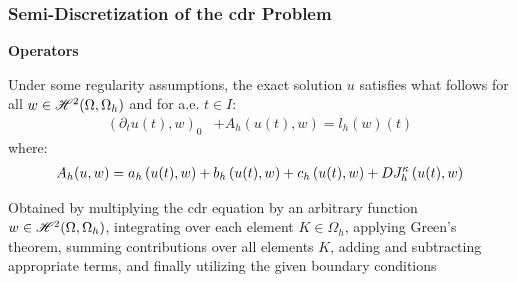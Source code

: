 \begin{frame}
    \frametitle{Semi-Discretization of the \acrshort{cdr} Problem}

    \vspace*{\fill}
    \begin{center}
        {\color{\accentcolor} \Large \textbf{Operators}}
        \vspace*{0.25cm}

        \begin{minipage}{0.75\textwidth}
            \begin{definition}
                Under some regularity assumptions, the exact solution $u$ satisfies what follows for all $w \in \mathscr{H}^{2}(\Omega, \Omega_h)$ and for a.e. $t \in I$:
                \begin{align*}
                    \left( \partial_t u(t), w \right)_0 &+ A_h(u(t), w) = l_h \left( w \right) (t)
                \end{align*}
                where:
                \begin{align*}
                    A_h(u, w) = a_h \left( u(t), w \right) + b_h \left( u(t), w \right) + c_h \left( u(t), w \right) + D J^{\kappa}_h \left( u(t), w \right)
                \end{align*}
            \end{definition}
        \end{minipage}
    \end{center}

    \vspace*{\fill}

    \begin{flushleft}
        \begin{minipage}{0.75\textwidth}
            {\footnotesize Obtained by multiplying the \acrshort{cdr} equation by an arbitrary function $w \in \mathscr{H}^{2}(\Omega, \Omega_h)$, integrating over each element $K \in \Omega_h$, applying Green's theorem, summing contributions over all elements $K$, adding and subtracting appropriate terms, and finally utilizing the given boundary conditions}
        \end{minipage}
    \end{flushleft}
    
\end{frame}

